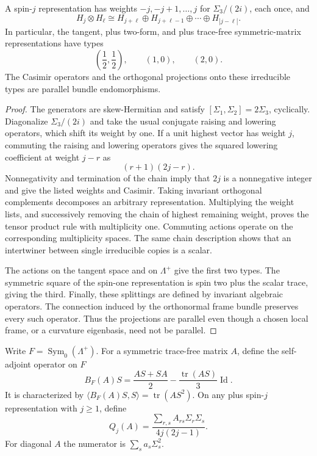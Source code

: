 \begin{lemma}
\label{lem:spin-algebra}
A spin-$j$ representation has weights
$-j,-j+1,\ldots,j$ for $\Sigma_3/(2i)$, each once, and
\[
 H_j\otimes H_\ell
 \cong H_{j+\ell}\oplus H_{j+\ell-1}\oplus\cdots\oplus H_{|j-\ell|}.
\]
In particular, the tangent, plus two-form, and plus trace-free
symmetric-matrix representations have types
\[
 \left(\frac12,\frac12\right),\qquad (1,0),\qquad (2,0).
\]
The Casimir operators and the orthogonal projections onto these
irreducible types are parallel bundle endomorphisms.
\end{lemma}

\begin{proof}
The generators are skew-Hermitian and satisfy
$[\Sigma_1,\Sigma_2]=2\Sigma_3$, cyclically. Diagonalize
$\Sigma_3/(2i)$ and take the usual conjugate raising and lowering
operators, which shift its weight by one. If a unit highest vector
has weight $j$, commuting the raising and lowering operators gives
the squared lowering coefficient at weight $j-r$ as
\[
 (r+1)(2j-r).
\]
Nonnegativity and termination of the chain imply that $2j$ is a
nonnegative integer and give the listed weights and Casimir.
Taking invariant orthogonal complements decomposes an arbitrary
representation. Multiplying the weight lists, and successively
removing the chain of highest remaining weight, proves the tensor
product rule with multiplicity one. Commuting actions operate on the
corresponding multiplicity spaces. The same chain description shows
that an intertwiner between single irreducible copies is a scalar.

The actions on the tangent space and on $\Lambda^+$ give the first
two types. The symmetric square of the spin-one representation is
spin two plus the scalar trace, giving the third. Finally, these
splittings are defined by invariant algebraic operators. The
connection induced by the orthonormal frame bundle preserves every
such operator. Thus the projections are parallel even though a
chosen local frame, or a curvature eigenbasis, need not be parallel.
\end{proof}

Write $F=\operatorname{Sym}_0(\Lambda^+)$. For a symmetric trace-free
matrix $A$, define the self-adjoint operator on $F$
\[
 B_F(A)S=\frac{AS+SA}{2}
         -\frac{\operatorname{tr}(AS)}3\operatorname{Id}.
\]
It is characterized by
$\langle B_F(A)S,S\rangle=\operatorname{tr}(AS^2)$.
On any plus spin-$j$ representation with $j\ge1$, define
\[
 Q_j(A)=\frac{\sum_{r,s}A_{rs}\Sigma_r\Sigma_s}{4j(2j-1)}.
\]
For diagonal $A$ the numerator is $\sum_s a_s\Sigma_s^2$.

